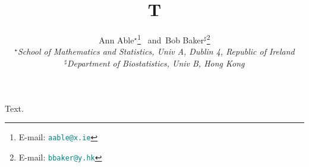 \documentclass{article}
\title{T}
\author{Ann Able$^\star$\footnote{E-mail: \textcolor{teal}{\texttt{aable@x.ie}}}\,\,\, and\, Bob Baker$^\sharp$\footnote{E-mail: \textcolor{teal}{\texttt{bbaker@y.hk}}}\hspace{.2cm}\\
    {\it \normalsize $^\star$School of Mathematics and Statistics, Univ A, Dublin 4, Republic of Ireland}\\
    {\it \normalsize $^\sharp$Department of Biostatistics, Univ B, Hong Kong}}
\begin{document}
\maketitle
Text.
\end{document}
